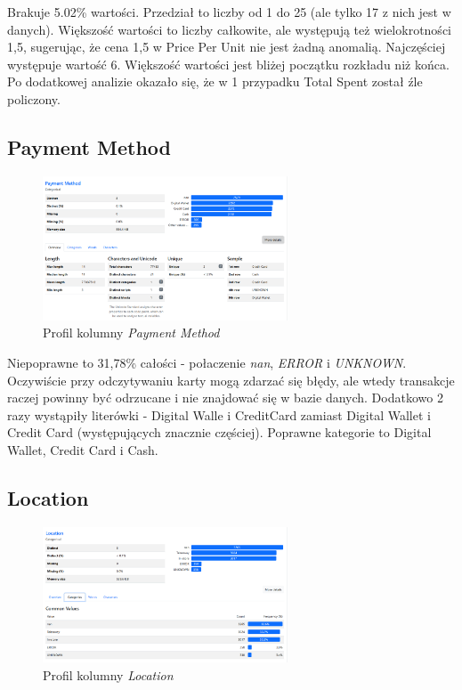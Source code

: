\documentclass[a4paper,12pt]{article}
\begin{document}
Brakuje 5.02\% wartości. Przedział to liczby od 1 do 25 (ale tylko 17 z nich jest w danych). Większość wartości to liczby całkowite, ale występują też wielokrotności 1,5, sugerując, że cena 1,5 w Price Per Unit nie jest żadną anomalią. Najczęściej występuje wartość 6. Większość wartości jest bliżej początku rozkładu niż końca. Po dodatkowej analizie okazało się, że w 1 przypadku Total Spent został źle policzony.

\subsection{Payment Method}

\begin{figure}[H]
  \centering
  \includegraphics[width=0.65\textwidth]{images/py_6.png}
  \caption{Profil kolumny \textit{Payment Method}}
\end{figure}

Niepoprawne to 31,78\% całości - połaczenie \textit{nan}, \textit{ERROR} i \textit{UNKNOWN}. Oczywiście przy odczytywaniu karty mogą zdarzać się błędy, ale wtedy transakcje raczej powinny być odrzucane i nie znajdować się w bazie danych. Dodatkowo 2 razy wystąpiły literówki - Digital Walle i CreditCard zamiast Digital Wallet i Credit Card (występujących znacznie częściej). Poprawne kategorie to Digital Wallet, Credit Card	i Cash.

\subsection{Location}

\begin{figure}[H]
  \centering
  \includegraphics[width=0.65\textwidth]{images/py_7.png}
  \caption{Profil kolumny \textit{Location}}
\end{figure}
\end{document}
